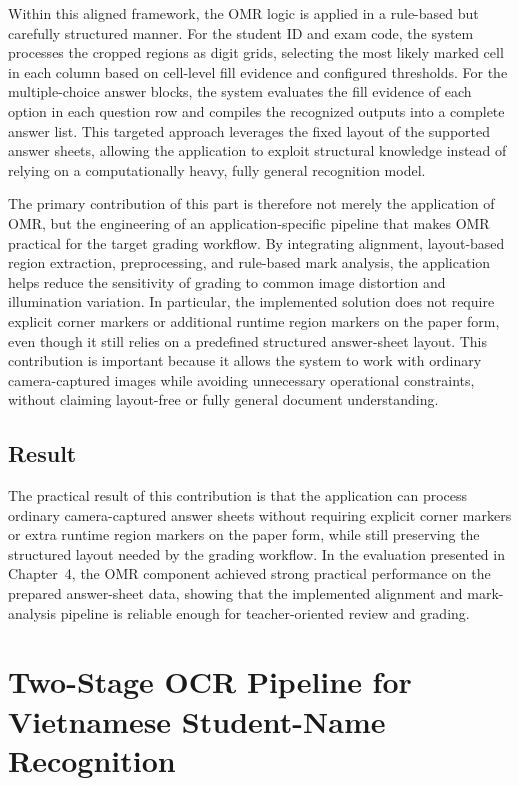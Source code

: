 \documentclass[../Main.tex]{subfiles}
\begin{document}
Within this aligned framework, the OMR logic is applied in a rule-based but carefully structured manner. For the student ID and exam code, the system processes the cropped regions as digit grids, selecting the most likely marked cell in each column based on cell-level fill evidence and configured thresholds. For the multiple-choice answer blocks, the system evaluates the fill evidence of each option in each question row and compiles the recognized outputs into a complete answer list. This targeted approach leverages the fixed layout of the supported answer sheets, allowing the application to exploit structural knowledge instead of relying on a computationally heavy, fully general recognition model.

The primary contribution of this part is therefore not merely the application
of OMR, but the engineering of an application-specific pipeline that makes OMR
practical for the target grading workflow. By integrating alignment,
layout-based region extraction, preprocessing, and rule-based mark analysis,
the application helps reduce the sensitivity of grading to common image
distortion and illumination variation. In particular, the implemented solution
does not require explicit corner markers or additional runtime region markers
on the paper form, even though it still relies on a predefined structured
answer-sheet layout. This contribution is important because it allows the
system to work with ordinary camera-captured images while avoiding unnecessary
operational constraints, without claiming layout-free or fully general
document understanding.

\subsection{Result}
\label{subsection:5.1.3}

The practical result of this contribution is that the application can process
ordinary camera-captured answer sheets without requiring explicit corner
markers or extra runtime region markers on the paper form, while still
preserving the structured layout needed by the grading workflow. In the
evaluation presented in Chapter~4, the OMR component achieved strong practical
performance on the prepared answer-sheet data, showing that the implemented
alignment and mark-analysis pipeline is reliable enough for teacher-oriented
review and grading.

\section{Two-Stage OCR Pipeline for Vietnamese Student-Name Recognition}
\label{section:5.2}
\end{document}
